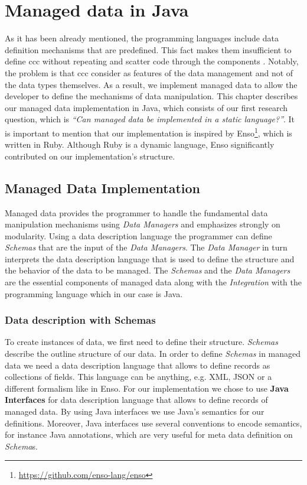 
\chapter{Managed data in Java}\label{Implementation}

As it has been already mentioned, the programming languages include data definition mechanisms that are predefined. 
This fact makes them insufficient to define \ac{ccc} without repeating and scatter code through the components \cite{loh2012managed}.
Notably, the problem is that \ac{ccc} consider as features of the data management and not of the data types themselves.
As a result, we implement managed data to allow the developer to define the mechanisms of data manipulation.
This chapter describes our managed data implementation in Java, which consists of our first research question, which is \textit{``Can managed data be implemented in a static language?''}.
It is important to mention that our implementation is inspired by Enso\footnote{\url{https://github.com/enso-lang/enso}}, which is written in Ruby. 
Although Ruby is a dynamic language, Enso significantly contributed on our implementation's structure.

\section{Managed Data Implementation}\label{sec:Managed Data Implementation}
Managed data provides the programmer to handle the fundamental data manipulation mechanisms using \textit{Data Managers} and emphasizes strongly on modularity.
Using a data description language the programmer can define \textit{Schemas} that are the input of the \textit{Data Managers}. The \textit{Data Manager} in turn interprets the data description language that is used to define the structure and the behavior of the data to be managed.
The \textit{Schemas} and the \textit{Data Managers} are the essential components of managed data along with the \textit{Integration} with the programming language which in our case is Java.

\subsection{Data description with Schemas}\label{Schema Definition}
To create instances of data, we first need to define their structure.
\textit{Schemas} describe the outline structure of our data.
In order to define \textit{Schemas} in managed data we need a data description language that allows to define records as collections of fields. 
This language can be anything, e.g. XML, JSON or a different formalism like in Enso.
For our implementation we chose to use \textbf{Java Interfaces} for data description language that allows to define records of managed data.
By using Java interfaces we use Java's semantics for our definitions.
Moreover, Java interfaces use several conventions to encode semantics, for instance Java annotations, which are very useful for meta data definition on \textit{Schema}s.

